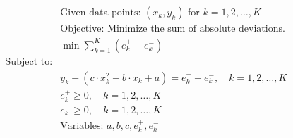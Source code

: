 \documentclass{article}
\begin{document}
\begin{align*}
& \text{Given data points: } (x_k, y_k) \text{ for } k = 1, 2, \ldots, K \\
& \text{Objective: Minimize the sum of absolute deviations.} \\

& \min \sum_{k=1}^{K} (e_k^+ + e_k^-) \\

\text{Subject to:} \\

& y_k - (c \cdot x_k^2 + b \cdot x_k + a) = e_k^+ - e_k^-, \quad k = 1, 2, \ldots, K \\

& e_k^+ \geq 0, \quad k = 1, 2, \ldots, K \\
& e_k^- \geq 0, \quad k = 1, 2, \ldots, K \\

& \text{Variables: } a, b, c, e_k^+, e_k^-
\end{align*}
\end{document}
